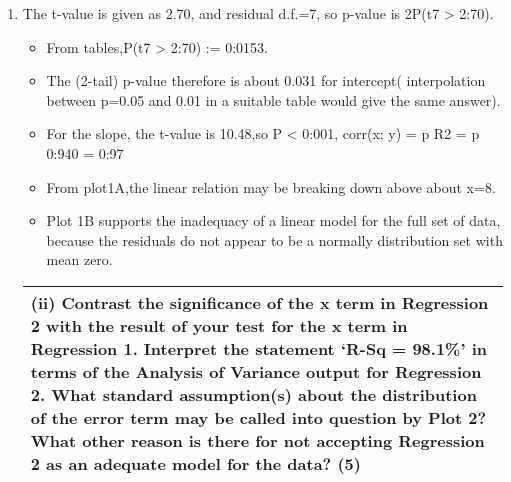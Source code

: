 \documentclass[a4paper,12pt]{article}
\begin{document}
\begin{enumerate}
    \item The t-value is given as 2.70, and residual d.f.=7, so p-value is 2P(t7 > 2:70).
    \begin{itemize}
        \item From tables,P(t7 > 2:70)
:=
0:0153.
    \end{itemize}
\begin{itemize}
    \item The (2-tail) p-value therefore is about 0.031 for intercept(
interpolation between p=0.05 and 0.01 in a suitable table would give the same
answer).
\item For the slope, the t-value is 10.48,so P < 0:001, corr(x; y) =
p
R2 =
p
0:940 = 0:97

\item From plot1A,the linear relation may be breaking down above about x=8. 
\item Plot 1B supports
the inadequacy of a linear model for the full set of data, because the residuals do not appear to be a normally distribution set with mean zero.
\end{itemize}

  \begin{table}[ht!]
     \centering
     \begin{tabular}{|p{15cm}|}
     \hline  
 
(ii) Contrast the significance of the x term in Regression 2 with the result of your test for the x term in Regression 1.  Interpret the statement ‘R-Sq = 98.1\%’ in terms of the Analysis of Variance output for Regression 2.  What standard assumption(s) about the distribution of the error term may be called into question by Plot 2?  What other reason is there for not accepting Regression 2 as an adequate model for the data? (5) 
  \\ \hline
      \end{tabular}
    \end{table}
    

\end{enumerate}
\end{document}
